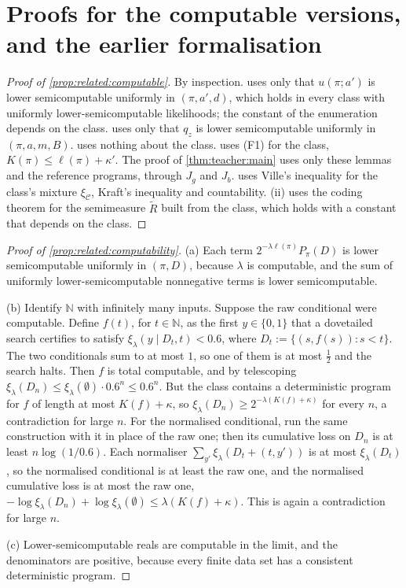 \section{Proofs for the computable versions, and the earlier formalisation}\label{app:related}

\begin{proof}[Proof of \cref{prop:related:computable}]
By inspection.  uses only that $u(\pi;a')$ is lower semicomputable uniformly in $(\pi,a',d)$, which holds in every class with uniformly lower-semicomputable likelihoods; the constant of the enumeration depends on the class.  uses only that $q_z$ is lower semicomputable uniformly in $(\pi,a,m,B)$.  uses nothing about the class.  uses (F1) for the class, $K(\pi)\le\ell(\pi)+\kappa'$. The proof of \cref{thm:teacher:main} uses only these lemmas and the reference programs, through $J_g$ and $J_b$.  uses Ville's inequality for the class's mixture $\xi_{\mathcal C}$, Kraft's inequality and countability. (ii) uses the coding theorem for the semimeasure $\tilde R$ built from the class, which holds with a constant that depends on the class.
\end{proof}

\begin{proof}[Proof of \cref{prop:related:computability}]
(a) Each term $2^{-\lambda\ell(\pi)}P_\pi(D)$ is lower semicomputable uniformly in $(\pi,D)$, because $\lambda$ is computable, and the sum of uniformly lower-semicomputable nonnegative terms is lower semicomputable.

(b) Identify $\mathbb N$ with infinitely many inputs. Suppose the raw conditional were computable. Define $f(t)$, for $t\in\mathbb N$, as the first $y\in\{0,1\}$ that a dovetailed search certifies to satisfy $\xi_\lambda(y\mid D_t,t)<0.6$, where $D_t:=\{(s,f(s)):s<t\}$. The two conditionals sum to at most $1$, so one of them is at most $\frac12$ and the search halts. Then $f$ is total computable, and by telescoping $\xi_\lambda(D_n)\le\xi_\lambda(\emptyset)\cdot0.6^n\le0.6^n$. But the class contains a deterministic program for $f$ of length at most $K(f)+\kappa$, so $\xi_\lambda(D_n)\ge2^{-\lambda(K(f)+\kappa)}$ for every $n$, a contradiction for large $n$. For the normalised conditional, run the same construction with it in place of the raw one; then its cumulative loss on $D_n$ is at least $n\log(1/0.6)$. Each normaliser $\sum_{y'}\xi_\lambda(D_t+(t,y'))$ is at most $\xi_\lambda(D_t)$, so the normalised conditional is at least the raw one, and the normalised cumulative loss is at most the raw one, $-\log\xi_\lambda(D_n)+\log\xi_\lambda(\emptyset)\le\lambda(K(f)+\kappa)$. This is again a contradiction for large $n$.

(c) Lower-semicomputable reals are computable in the limit, and the denominators are positive, because every finite data set has a consistent deterministic program.
\end{proof}

